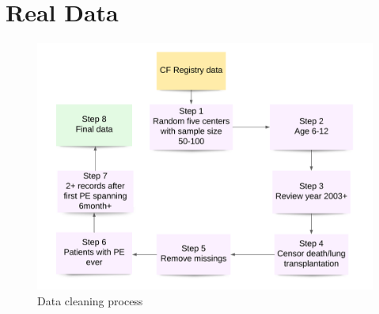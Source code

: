 \section{Real Data}

\begin{figure}[H]
\centering
\includegraphics[width=\textwidth]{Figures/Chp2_app_dtclean.png}
\caption{Data cleaning process}
\end{figure}

